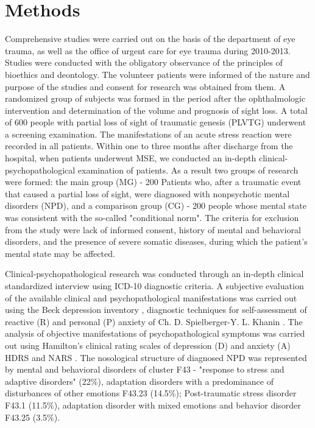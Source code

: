 \documentclass[twocolumn]{article}
\begin{document}
\section {Methods}
\par Comprehensive studies were carried out on the basis of the department of eye trauma, as well as the office of urgent care for eye trauma during 2010-2013. Studies were conducted with the obligatory observance of the principles of bioethics and deontology. The volunteer patients were informed of the nature and purpose of the studies and consent for research was obtained from them. A randomized group of subjects was formed in the period after the ophthalmologic intervention and determination of the volume and prognosis of sight loss. A total of 600 people with partial loss of sight of traumatic genesis (PLVTG) underwent a screening examination. The manifestations of an acute stress reaction were recorded in all patients. Within one to three months after discharge from the hospital, when patients underwent MSE, we conducted an in-depth clinical-psychopathological examination of patients. As a result two groups of research were formed: the main group (MG) - 200 Patients who, after a traumatic event that caused a partial loss of sight, were diagnosed with nonpsychotic mental disorders (NPD), and a comparison group (CG) - 200 people whose mental state was consistent with the so-called "conditional norm". The criteria for exclusion from the study were lack of informed consent, history of mental and behavioral disorders, and the presence of severe somatic diseases, during which the patient's mental state may be affected.
\par Clinical-psychopathological research was conducted through an in-depth clinical standardized interview using ICD-10 diagnostic criteria. A subjective evaluation of the available clinical and psychopathological manifestations was carried out using the Beck depression inventory \cite{bib9}, diagnostic techniques for self-assessment of reactive (R) and personal (P) anxiety of Ch. D. Spielberger-Y. L. Khanin \cite{bib10}. The analysis of objective manifestations of psychopathological symptoms was carried out using Hamilton’s clinical rating scales of depression (D) and anxiety (A) HDRS and NARS \cite{bib11}. The nosological structure of diagnosed NPD was represented by mental and behavioral disorders of cluster F43 - "response to stress and adaptive disorders" (22\%), adaptation disorders with a predominance of disturbances of other emotions F43.23 (14.5\%); Post-traumatic stress disorder F43.1 (11.5\%), adaptation disorder with mixed emotions and behavior disorder F43.25 (3.5\%).
\end{document}

